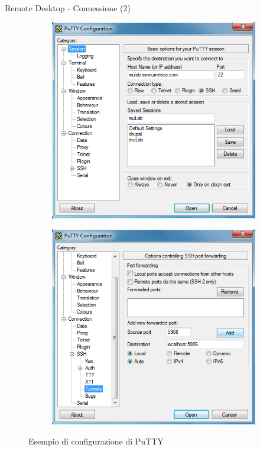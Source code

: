 \documentclass{beamer}
\begin{document}
\begin{frame}{Remote Desktop - Connessione (2)}
\begin{figure}
\centering
\begin{subfigure}{.5\textwidth}
  \centering
  \includegraphics[scale=0.35]{images/putty_session_config.png}
\end{subfigure}%
\begin{subfigure}{.5\textwidth}
  \centering
  \includegraphics[scale=0.35]{images/putty_tunnelling_config.png}
\end{subfigure}
\caption{Esempio di configurazione di PuTTY}
\end{figure}

\end{frame}
\end{document}
